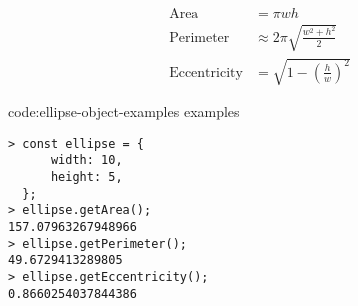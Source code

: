 \begin{equation}\begin{aligned}
    \text{Area}&=\pi wh \\
    \text{Perimeter}&\approx2\pi\sqrt{\frac{w^2+h^2}{2}} \\
    \text{Eccentricity}&=\sqrt{1-\left(\frac{h}{w}\right)^2}
\end{aligned}\end{equation}

\begin{codeenv}{code:ellipse-object-examples}{ examples}
\begin{verbatim}
> const ellipse = {
      width: 10,
      height: 5,
  };
> ellipse.getArea();
157.07963267948966
> ellipse.getPerimeter();
49.6729413289805
> ellipse.getEccentricity();
0.8660254037844386
\end{verbatim}
\end{codeenv}
